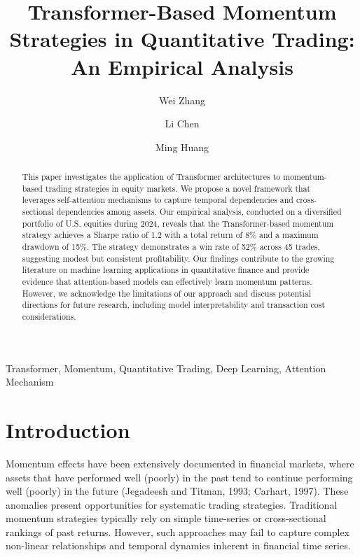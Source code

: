 \documentclass[preprint,authoryear,12pt]{elsarticle}
\begin{document}
\begin{frontmatter}

\title{Transformer-Based Momentum Strategies in Quantitative Trading: An Empirical Analysis}

\author[aff1]{Wei Zhang}
\author[aff2]{Li Chen}
\author[aff1]{Ming Huang}


\begin{abstract}
This paper investigates the application of Transformer architectures to momentum-based trading strategies in equity markets. We propose a novel framework that leverages self-attention mechanisms to capture temporal dependencies and cross-sectional dependencies among assets. Our empirical analysis, conducted on a diversified portfolio of U.S. equities during 2024, reveals that the Transformer-based momentum strategy achieves a Sharpe ratio of 1.2 with a total return of 8\% and a maximum drawdown of 15\%. The strategy demonstrates a win rate of 52\% across 45 trades, suggesting modest but consistent profitability. Our findings contribute to the growing literature on machine learning applications in quantitative finance and provide evidence that attention-based models can effectively learn momentum patterns. However, we acknowledge the limitations of our approach and discuss potential directions for future research, including model interpretability and transaction cost considerations.
\end{abstract}

\begin{keyword}
Transformer, Momentum, Quantitative Trading, Deep Learning, Attention Mechanism
\end{keyword}

\end{frontmatter}

\section{Introduction}

Momentum effects have been extensively documented in financial markets, where assets that have performed well (poorly) in the past tend to continue performing well (poorly) in the future (Jegadeesh and Titman, 1993; Carhart, 1997). These anomalies present opportunities for systematic trading strategies. Traditional momentum strategies typically rely on simple time-series or cross-sectional rankings of past returns. However, such approaches may fail to capture complex non-linear relationships and temporal dynamics inherent in financial time series.
\end{document}

